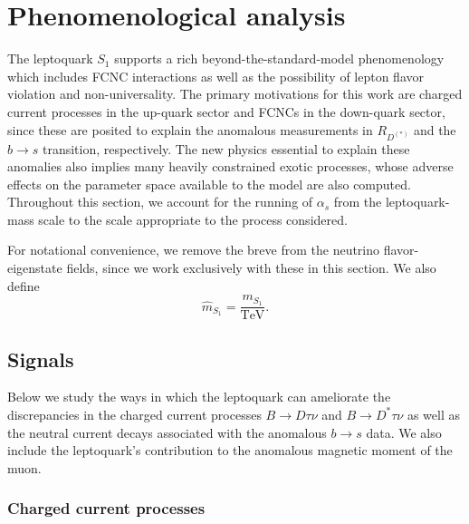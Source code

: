 \section{Phenomenological analysis}
\label{sec:ch3-phenomenologicalanalysis}

The leptoquark $S_{1}$ supports a rich beyond-the-standard-model phenomenology
which includes FCNC interactions as well as the possibility of lepton flavor
violation and non-universality. The primary motivations for this work are
charged current processes in the up-quark sector and FCNCs in the down-quark
sector, since these are posited to explain the anomalous measurements in
$R_{D^{(*)}}$ and the $b \to s$ transition, respectively. The new physics
essential to explain these anomalies also implies many heavily constrained
exotic processes, whose adverse effects on the parameter space available to the
model are also computed. Throughout this section, we account for the running of
$\alpha_s$ from the leptoquark-mass scale to the scale appropriate to the
process considered.

For notational convenience, we remove the breve from the neutrino
flavor-eigenstate fields, since we work exclusively with these in this section.
We also define
\begin{equation}
  \hat{m}_{S_{1}} = \frac{m_{S_{1}}}{\text{TeV}}.
\end{equation}

\subsection{Signals}
\label{sec:ch3-signals}

Below we study the ways in which the leptoquark can ameliorate the discrepancies
in the charged current processes ${B} \to D \tau \nu$ and $B \to D^* \tau \nu$
as well as the neutral current decays associated with the anomalous $b \to s$
data. We also include the leptoquark's contribution to the anomalous magnetic
moment of the muon.

\subsubsection{Charged current processes}
\label{sec:ch3-chargedcurrentprocesses}

